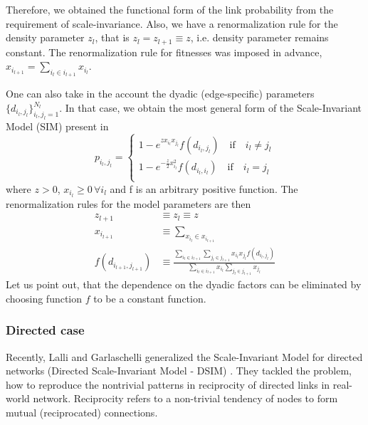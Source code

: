 Therefore, we obtained the functional form of the link probability from the requirement of scale-invariance. Also, we have a renormalization rule for the density parameter $z_l$, that is $z_l = z_{l+1} \equiv z$, i.e. density parameter remains constant. The renormalization rule for fitnesses was imposed in advance, $x_{i_{l+1}} = \sum_{i_l\in i_{l+1}} x_{i_l}$.

One can also take in the account the dyadic (edge-specific) parameters $\{d_{i_l,j_l}\}_{i_l,j_l=1}^{N_l}$. In that case, we obtain the most general form of the Scale-Invariant Model (SIM) present in \cite{Garuccio2023}
\begin{equation}
    p_{i_l,j_l} = 
    \begin{cases}1 - e^{zx_{i_l}x_{j_l}}f(d_{i_l,j_l}) \quad \text{if} \quad i_l \neq j_l \\
    1 - e^{-\frac{z}{2}x_{i_l}^2}f(d_{i_l,i_l}) \quad \text{if} \quad i_l = j_l \\
    \end{cases}
\end{equation}
where $z>0$, $x_{i_l} \geq 0 \, \forall i_l$ and f is an arbitrary positive function. The renormalization rules for the model parameters are then
\begin{align}
    z_{l+1} &\equiv z_l \equiv z \\
    x_{i_{l+1}} &\equiv \sum_{x_{i_l}\in x_{i_{l+1}}} \\
    f(d_{i_{l+1},j_{l+1}}) &\equiv \frac{\sum_{i_l\in i_{l+1}}\sum_{j_l\in j_{l+1}}x_{i_l}x_{j_l}f(d_{i_l,j_l})}{\sum_{i_l\in i_{l+1}}x_{i_l}\sum_{j_l\in j_{l+1}}x_{j_l}}
\end{align}
Let us point out, that the dependence on the dyadic factors can be eliminated by choosing function $f$ to be a constant function.

\subsubsection{Directed case}
Recently, Lalli and Garlaschelli generalized the Scale-Invariant Model for directed networks (Directed Scale-Invariant Model - DSIM) \cite{Lalli2024}. They tackled the problem, how to reproduce the nontrivial patterns in reciprocity of directed links in real-world network. Reciprocity refers to a non-trivial tendency of nodes to form mutual (reciprocated) connections.

